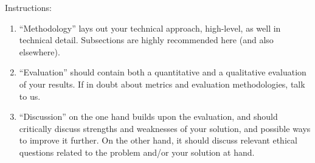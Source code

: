 \documentclass[11pt]{article}
\begin{document}
% 

%

Instructions: 
\begin{enumerate}


    \item ``Methodology'' lays out your technical approach, high-level, as well in technical detail. Subsections are highly recommended here (and also elsewhere).
    \item ``Evaluation'' should contain both a quantitative and a qualitative evaluation of your results. If in doubt about metrics and evaluation methodologies, talk to us.
    \item ``Discussion'' on the one hand builds upon the evaluation, and should critically discuss strengths and weaknesses of your solution, and possible ways to improve it further. On the other hand, it should discuss relevant ethical questions related to the problem and/or your solution at hand.
\end{enumerate}
\end{document}
